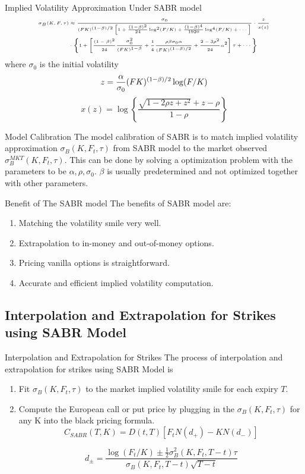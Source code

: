 \documentclass[10pt,table,mathserif]{beamer}
\begin{document}
\begin{frame}{Implied Volatility Approximation Under SABR model}
\[	\tiny
\begin{split}
\sigma_B(K,F,\tau) &\approx
\frac{\sigma_0}{(FK)^{(1-\beta)/2}\left[1+\frac{(1-\beta)^2}{24}\log^2(F/K)
	+ \frac{(1-\beta)^4}{1920}\log^4(F/K) + \cdots\right]} \cdot
\frac{z}{x(z)}  \\
&  \cdot \left\{1+\left[\frac{(1-\beta)^2}{24}\frac{\sigma_0^2}{(FK)^{1-\beta}}
+ \frac{1}{4} \frac{\rho\beta\sigma_0\alpha}{(FK)^{(1-\beta)/2}} +
\frac{2-3\rho^2}{24}\alpha^2 \right]\tau+\cdots\right\}
\end{split}
\]
where $\sigma_0$ is the initial volatility
\[\tiny
z = \frac{\alpha}{\sigma_0}(FK)^{(1-\beta)/2}\log (F/K)\]
\[ x(z) =
\log\left\{\frac{\sqrt{1-2\rho z + z^2}+z-\rho}{1-\rho}\right\}
\]

\end{frame}



\begin{frame}{Model Calibration}
The model calibration of SABR is to match implied volatility approximation $\sigma_B(K,F_t,\tau)$ from SABR model to the market observed $\sigma^{MKT}_B(K,F_t,\tau)$. This can be done by solving a optimization problem with the parameters to be $\alpha,\rho,\sigma_0$. $\beta$ is usually predetermined and not optimized together with other parameters.
\end{frame}


\begin{frame}{Benefit of The SABR model}
The benefits of SABR model are:
\begin{enumerate}
	\item  Matching the volatility smile very well.
	\item  Extrapolation to in-money and  out-of-money options.
	\item  Pricing vanilla options is straightforward.
	\item  Accurate and efficient implied volatility computation.
\end{enumerate}
\end{frame}
\subsection{Interpolation and Extrapolation for Strikes using SABR Model}
\begin{frame}{Interpolation and Extrapolation for Strikes}
The process of interpolation and extrapolation for strikes using SABR Model is
\begin{enumerate}
	\item  Fit $\sigma_B(K,F_t,\tau)$ to the market implied volatility smile for each expiry $T$.
	\item  Compute the European call or put price by plugging in the $\sigma_B(K,F_t,\tau)$ for any K into the black pricing formula.
	\[
	C_{SABR}(T,K) =  D(t,T)[F_t N(d_+)-KN(d_-)]\]
	
	 \[d_{\pm} =
	\frac{\log(F_t/K)\pm \frac{1}{2}\sigma_B^2(K,F_t,T-t)
		\tau}{\sigma_B(K,F_t,T-t)\sqrt{T-t}}
	\]
\end{enumerate}
\end{frame}
\end{document}
